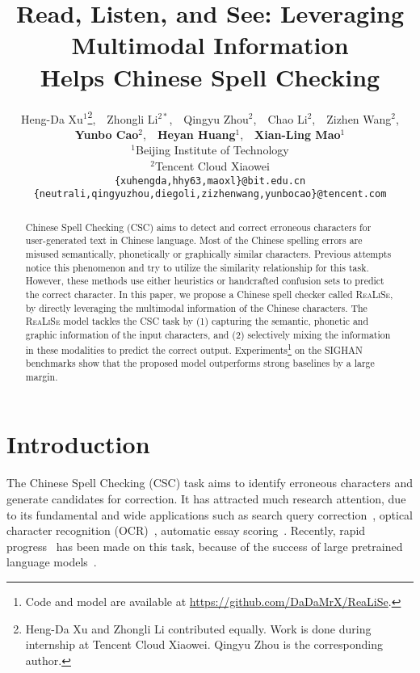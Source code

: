 \documentclass[11pt,a4paper]{article}
\title{Read, Listen, and See: Leveraging Multimodal Information \\ Helps Chinese Spell Checking}
\author{Heng-Da Xu$^1$\thanks{\; Heng-Da Xu and Zhongli Li contributed equally. Work is done during internship at Tencent Cloud Xiaowei. Qingyu Zhou is the corresponding author.},~~Zhongli Li$^{2*}$,~~Qingyu Zhou$^2$,~~Chao Li$^2$,~~Zizhen Wang$^2$,\\\textbf{Yunbo Cao}$^2$,~~\textbf{Heyan Huang}$^1$,~~\textbf{Xian-Ling Mao}$^1$
 \\
  $^1$Beijing Institute of Technology \\
  $^2$Tencent Cloud Xiaowei \\
   \texttt{\{xuhengda,hhy63,maoxl\}@bit.edu.cn} \\
   \texttt{\{neutrali,qingyuzhou,diegoli,zizhenwang,yunbocao\}@tencent.com}
  }
\date{}
\newcommand\model{\textsc{ReaLiSe}}
\begin{document}
\maketitle
\begin{abstract}
Chinese Spell Checking (CSC) aims to detect and correct erroneous characters for user-generated text in Chinese language.
Most of the Chinese spelling errors are misused semantically, phonetically or graphically similar characters.
Previous attempts notice this phenomenon and try to utilize the similarity relationship for this task.
However, these methods use either heuristics or handcrafted confusion sets to predict the correct character.
In this paper, we propose a Chinese spell checker called \model{}, by directly leveraging the multimodal information of the Chinese characters.
The \model{} model tackles the CSC task by (1) capturing the semantic, phonetic and graphic information of the input characters, and (2) selectively mixing the information in these modalities to predict the correct output.
Experiments\footnote{Code and model are available at \url{https://github.com/DaDaMrX/ReaLiSe}.} on the SIGHAN benchmarks show that the proposed model outperforms strong baselines by a large margin.
\end{abstract}

\section{Introduction}

The Chinese Spell Checking (CSC) task aims to identify erroneous characters and generate candidates for correction. It has attracted much research attention, due to its fundamental and wide applications such as search query correction~\cite{app-search,gao-etal-2010}, optical character recognition (OCR)~\cite{afli2016using}, automatic essay scoring~\cite{dong2016automatic}.
Recently, rapid progress~\citep{softmask-spell, spellgcn} has been made on this task, because of the success of large pretrained language models~\citep{bert,roberta,xlnet}.
\end{document}
